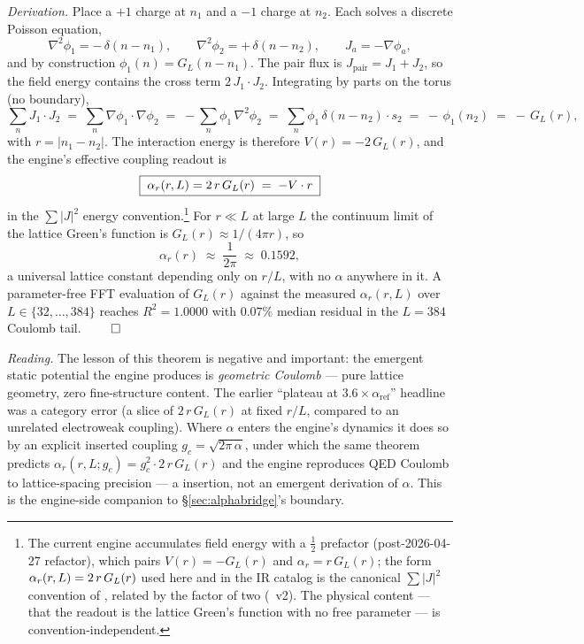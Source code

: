 \emph{Derivation.} Place a $+1$ charge at $n_1$ and a $-1$ charge at $n_2$. Each
solves a discrete Poisson equation,
\[
  \nabla^2 \phi_1 = -\,\delta(n - n_1), \qquad
  \nabla^2 \phi_2 = +\,\delta(n - n_2), \qquad
  J_a = -\nabla\phi_a,
\]
and by construction $\phi_1(n) = G_L(n - n_1)$. The pair flux is
$J_{\mathrm{pair}} = J_1 + J_2$, so the field energy contains the cross term
$2\,J_1\!\cdot\! J_2$. Integrating by parts on the torus (no boundary),
\[
  \sum_n J_1\!\cdot\! J_2
  \;=\; \sum_n \nabla\phi_1\!\cdot\!\nabla\phi_2
  \;=\; -\sum_n \phi_1\,\nabla^2\phi_2
  \;=\; \sum_n \phi_1\,\delta(n-n_2)\cdot s_2
  \;=\; -\,\phi_1(n_2)
  \;=\; -\,G_L(r),
\]
with $r = |n_1 - n_2|$. The interaction energy is therefore $V(r) = -2\,G_L(r)$,
and the engine's effective coupling readout is
\[
  \boxed{\;\alpha_r(r,L) = 2\,r\,G_L(r)\;=\; -V\cdot r\;}
\]
in the $\sum|J|^2$ energy convention.\footnote{The current engine accumulates
field energy with a $\tfrac12$ prefactor (post-2026-04-27 refactor), which pairs
$V(r) = -G_L(r)$ and $\alpha_r = r\,G_L(r)$; the form $\alpha_r(r,L) = 2\,r\,G_L(r)$ used here and
in the IR catalog is the canonical $\sum|J|^2$ convention of , related
by the factor of two (~v2). The physical content --- that the
readout is the lattice Green's function with no free parameter --- is
convention-independent.} For $r \ll L$ at large $L$ the continuum limit of the
lattice Green's function is $G_L(r) \approx 1/(4\pi r)$, so
\[
  \alpha_r(r) \;\approx\; \frac{1}{2\pi} \;\approx\; 0.1592,
\]
a universal lattice constant depending only on $r/L$, with no $\alpha$ anywhere
in it. A parameter-free FFT evaluation of $G_L(r)$ against the measured
$\alpha_r(r,L)$ over $L \in \{32,\dots,384\}$ reaches $R^2 = 1.0000$ with $0.07\%$
median residual in the $L=384$ Coulomb tail. \hfill$\qed$

\emph{Reading.} The lesson of this theorem is negative and important: the
emergent static potential the engine produces is \emph{geometric Coulomb} ---
pure lattice geometry, zero fine-structure content. The earlier ``plateau at
$3.6\times\alpha_{\mathrm{ref}}$'' headline was a category error (a slice of
$2\,r\,G_L(r)$ at fixed $r/L$, compared to an unrelated electroweak coupling).
Where $\alpha$ enters the engine's dynamics it does so by an explicit inserted
coupling $g_c = \sqrt{2\pi\,\alpha}$, under which the same theorem predicts
$\alpha_r(r,L;g_c) = g_c^2\cdot 2\,r\,G_L(r)$ and the engine reproduces QED
Coulomb to lattice-spacing precision --- a  insertion, not an emergent
derivation of $\alpha$. This is the engine-side companion to
\S\ref{sec:alphabridge}'s boundary.

